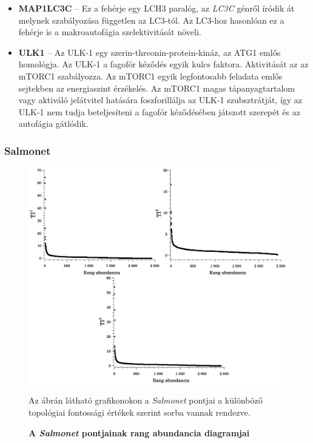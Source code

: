 \documentclass[a4paper,12pt]{article}
\newenvironment{imgdesc}{
		\small
		\singlespacing
		\begin{center}
		
	}{
		\end{center}	
	}
\begin{document}
\begin{itemize}
					\item \textbf{MAP1LC3C} -- Ez a fehérje egy LCH3 paralóg, az \textit{LC3C} génről íródik át melynek szabályozása független az LC3-tól. Az LC3-hoz hasonlóan ez a fehérje is a makroautofágia szelektivitását növeli.\cite{atg8_like}
					
					\item \textbf{ULK1} -- Az ULK-1 egy szerin-threonin-protein-kináz, az ATG1 emlős homológja. Az ULK-1 a fagofór kéződés egyik kulcs faktora. Aktivitását az az mTORC1 szabályozza. Az mTORC1 egyik legfontosabb feladata emlős sejtekben az energiaszint érzékelés. Az mTORC1 magas tápanyagtartalom vagy aktiváló jelátvitel hatására foszforillálja az ULK-1 szubsztrátját, így az ULK-1 nem tudja beteljesíteni a fagofór kéződésében játszott szerepét és az autofágia gátlódik. \cite{autophagy_proteins}
				\end{itemize}
				
		
		\subsubsection{Salmonet}
		
			\begin{figure}[H]
					\includegraphics[scale=0.44]{img/salmonet_tis.pdf}
					\centering
					\caption{ \textbf{A \textit{Salmonet} pontjainak rang abundancia diagramjai}}
					\begin{imgdesc}
						Az ábrán látható grafikonokon a \textit{Salmonet} pontjai a különböző topológiai fontossági értékek szerint sorba vannak rendezve. 
					\end{imgdesc}
		
					\label{fig:salmonet_stats}			 		 
				\end{figure}
		
\end{document}
